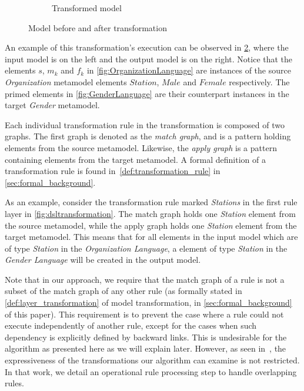 \begin{figure}[htb]
\begin{subfigure}[b]{0.40\textwidth}
                \caption{Transformed model}
                \label{fig:police_gender}
        \end{subfigure}%
        \caption{Model before and after transformation}
        \label{fig:transformationexample}
\end{figure}

An example of this transformation's execution can be observed in \cref{fig:transformationexample}, where the input model is on the left and the output model is on the right. Notice that the elements $s$, $m_k$  and $f_k$ in \cref{fig:OrganizationLanguage} are instances of the source \emph{Organization} metamodel elements $Station$, $Male$ and $Female$ respectively. The primed elements in \cref{fig:GenderLanguage} are their counterpart instances in the target \emph{Gender} metamodel.

Each individual transformation rule in the transformation is composed of two graphs. The first graph
is denoted as the \emph{match graph}, and is a pattern holding elements from the
source metamodel. Likewise, the \emph{apply graph} is a pattern containing
elements from the target metamodel. A formal definition of a transformation rule is found in~\cref{def:transformation_rule} in \cref{sec:formal_background}.

As an example, consider the transformation rule marked \emph{Stations} in the
first rule layer in \cref{fig:dsltransformation}. The match graph holds
one \emph{Station} element from the source metamodel, while the apply graph
holds one \emph{Station} element from the target metamodel. This means that for all
elements in the input model which are of type \emph{Station} in the
\emph{Organization Language}, a element of type
\emph{Station} in the \emph{Gender Language} will be created in the output model.

Note that in our approach, we require that the match graph of a rule is not a subset of the match graph of any other rule (as formally stated in \cref{def:layer_transformation} of model transformation, in \cref{sec:formal_background} of this paper). This requirement is to prevent the case where a rule could not execute independently of another rule, except for the cases when such dependency is explicitly defined by backward links. This is undesirable for the algorithm as presented here as we will explain later. However, as seen in~\cite{conf/gg/SelimLCDO14}, the expressiveness of the transformations our algorithm can examine is not restricted. In that work, we detail an operational rule processing step to handle overlapping rules.



